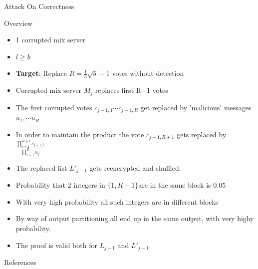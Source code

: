 \documentclass{beamer}
\begin{document}
\begin{frame}[allowframebreaks]{Attack On Correctness}
\begin{block}{Overview}
\begin{itemize}
\item 1 corrupted mix server
\item $l \geq b$
\item \textbf{Target}: Replace $R=\frac{1}{3}\sqrt{b}-1$ votes without detection
\end{itemize}
\end{block}
\begin{itemize}
\item Corrupted mix server $M_j$ replaces first R+1 votes
\item The first corrupted votes $c_{j-1,1} \cdots c_{j-1,R}$ get replaced by 'malicious' messages $u_1, \cdots u_R$
\item In order to maintain the product the vote $c_{j-1,R+1}$ gets replaced by $\frac {\prod_{i=1}^{R+1} c_{j-1,i}} {\prod_{i=1}^R u_j}$

\framebreak

\item The replaced list $L'_{j-1}$ gets reencrypted and shuffled.
\item Probability that 2 integers in $\{1,R+1\} $are in the same block is $0.05$
\item With very high probability all such integers are in different blocks
\item By way of output partitioning all end up in the same output, with very highy probability. 
\item The proof is valid both for $L_{j-1}$ and $L'_{j-1}$.
\end{itemize}
\end{frame}


\begin{frame}[allowframebreaks]{References}
\begin{small}


\end{small}
\nocite{*}
\end{frame}

 
\end{document}
